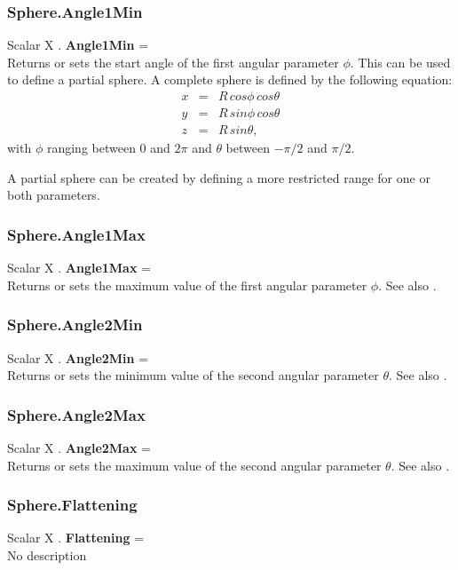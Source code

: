 \subsubsection{Sphere.Angle1Min \label{F:Sphere:Angle1Min}}
Scalar X . \textbf{Angle1Min} = \\
Returns or sets the start angle of the first angular parameter $\phi$. This can be used to define a partial sphere. A complete sphere is defined by the following equation:
\begin{equation}
\begin{array}{rcl}
x &=& R \, cos \phi \, cos \theta \\
y &=& R \, sin \phi \, cos \theta \\
z &=& R \, sin \theta,
\end{array}
\end{equation}
with $\phi$ ranging between $0$ and $2 \pi$ and $\theta$ between $- \pi / 2$ and $\pi / 2$.

A partial sphere can be created by defining a more restricted range for one or both parameters.

\subsubsection{Sphere.Angle1Max \label{F:Sphere:Angle1Max}}
Scalar X . \textbf{Angle1Max} = \\
Returns or sets the maximum value of the first angular parameter $\phi$. See also .

\subsubsection{Sphere.Angle2Min \label{F:Sphere:Angle2Min}}
Scalar X . \textbf{Angle2Min} = \\
Returns or sets the minimum value of the second angular parameter $\theta$. See also .


\subsubsection{Sphere.Angle2Max \label{F:Sphere:Angle2Max}}
Scalar X . \textbf{Angle2Max} = \\
Returns or sets the maximum value of the second angular parameter $\theta$. See also .



\subsubsection{Sphere.Flattening \label{F:Sphere:Flattening}}
Scalar X . \textbf{Flattening} = \\
No description

